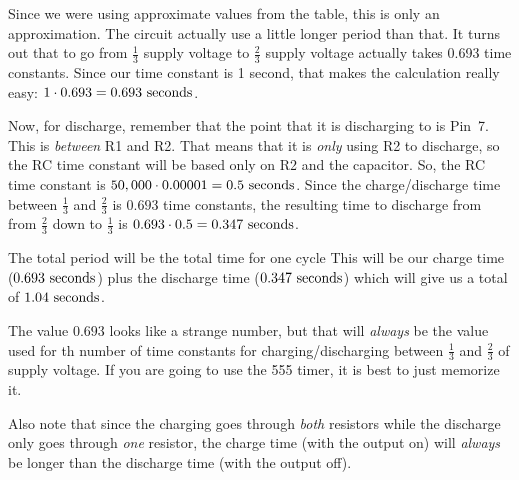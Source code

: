 Since we were using approximate values from the table, this is only an approximation.
The circuit actually use a little longer period than that.
It turns out that to go from $\frac{1}{3}$ supply voltage to $\frac{2}{3}$ supply voltage actually takes 0.693 time constants.
Since our time constant is 1 second, that makes the calculation really easy: $1\cdot 0.693 = 0.693\textrm{ seconds}$.

Now, for discharge, remember that the point that it is discharging to is Pin~7.
This is \emph{between} R1 and R2.
That means that it is \emph{only} using R2 to discharge, so the RC time constant will be based only on R2 and the capacitor.
So, the RC time constant is $50,000 \cdot 0.00001 = 0.5\textrm{ seconds}$.
Since the charge/discharge time between $\frac{1}{3}$ and $\frac{2}{3}$ is $0.693$ time constants, the resulting time to discharge from from $\frac{2}{3}$ down to $\frac{1}{3}$ is $0.693 \cdot 0.5 = 0.347\textrm{ seconds}$.

The total period will be the total time for one cycle
This will be our charge time ($0.693\textrm{ seconds}$) plus the discharge time ($0.347\textrm{ seconds}$) which will give us a total of $1.04\textrm{ seconds}$.

The value $0.693$ looks like a strange number, but that will \emph{always} be the value used for th number of time constants for charging/discharging between $\frac{1}{3}$ and $\frac{2}{3}$ of supply voltage.
If you are going to use the 555 timer, it is best to just memorize it.

Also note that since the charging goes through \emph{both} resistors while the discharge only goes through \emph{one} resistor, the charge time (with the output on) will \emph{always} be longer than the discharge time (with the output off).

